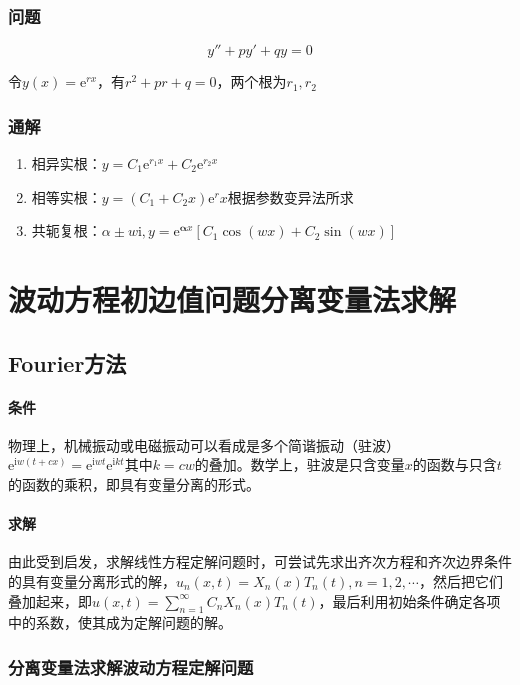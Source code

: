 \subsubsection{问题}
\[
y''+py'+qy=0
\]

令\(y(x)=\mathrm{e}^{rx}\)，有\(r^2+pr+q=0\)，两个根为\(r_1,r_2\)

\subsubsection{通解}
\begin{enumerate}
    \item 相异实根：\(y=C_1\mathrm{e}^{r_1x}+C_2\mathrm{e}^{r_2x}\)
    \item 相等实根：\(y=\left(C_1+C_2x\right)\mathrm{e}^{r}x\)根据参数变异法所求
    \item 共轭复根：\(\alpha\pm w\mathrm{i},y=\mathrm{e}^{\mathbf{\alpha}x}[C_1\cos( wx)+C_2\sin( wx)]\)
\end{enumerate}

\section{波动方程初边值问题分离变量法求解}

\subsection{Fourier方法}

\paragraph{条件}物理上，机械振动或电磁振动可以看成是多个简谐振动（驻波）\(\mathrm{e}^{\mathrm{i}w(t+cx)}=\mathrm{e}^{\mathrm{i}wt}\mathrm{e}^{\mathrm{i}kt}\)其中\(k=cw\)的叠加。数学上，驻波是只含变量\(x\)的函数与只含\(t\)的函数的乘积，即具有变量分离的形式。

\paragraph{求解}由此受到启发，求解线性方程定解问题时，可尝试先求出齐次方程和齐次边界条件的具有变量分离形式的解，\(u_n(x,t)=X_n(x)T_n(t),n=1,2,\cdots\)，然后把它们叠加起来，即\(u(x,t)=\sum\limits_{n=1}^{\infty} C_nX_n(x)T_n(t)\)，最后利用初始条件确定各项中的系数，使其成为定解问题的解。

\subsubsection{分离变量法求解波动方程定解问题}

